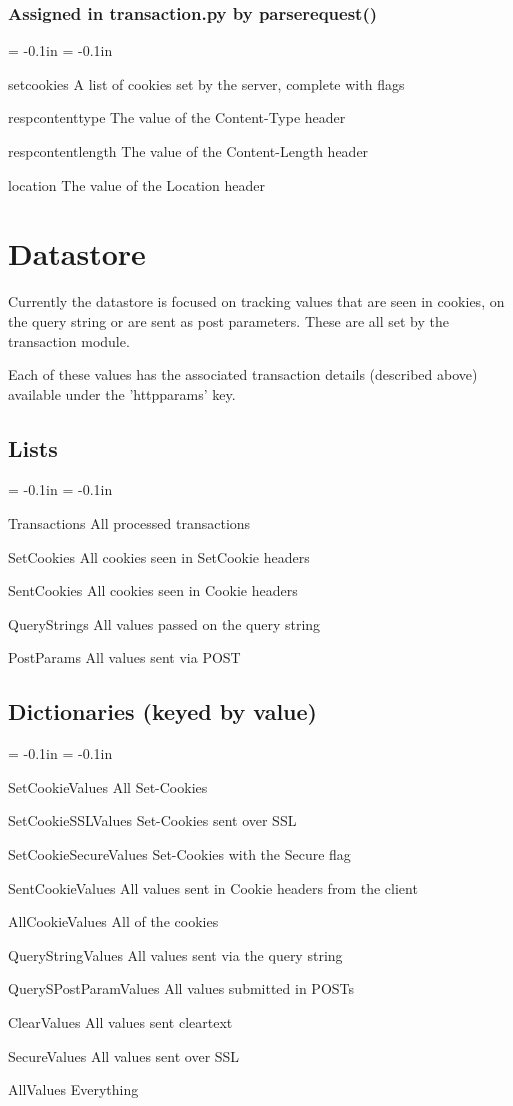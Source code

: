 \documentclass{article}
\newenvironment{mindesc}{\begin{description}\parsep = -0.1in \itemsep = -0.1in}{\end{description}}
\begin{document}
\subsubsection{Assigned in transaction.py by parserequest()}
\begin{mindesc}
\item[setcookies] A list of cookies set by the server, complete with flags
\item[respcontenttype] The value of the Content-Type header
\item[respcontentlength] The value of the Content-Length header
\item[location] The value of the Location header
\end{mindesc}


\section{Datastore}
Currently the datastore is focused on tracking values that are seen in cookies, 
on the query string or are sent as post parameters.  These are all set by the 
transaction module.

Each of these values has the associated transaction details (described above) 
available under the 'httpparams' key.

\subsection{Lists}
\begin{mindesc}
\item[Transactions] All processed transactions
\item[SetCookies] All cookies seen in SetCookie headers
\item[SentCookies] All cookies seen in Cookie headers\
\item[QueryStrings] All values passed on the query string
\item[PostParams] All values sent via POST
\end{mindesc}

\subsection{Dictionaries (keyed by value)}
\begin{mindesc}
\item[SetCookieValues] All Set-Cookies
\item[SetCookieSSLValues] Set-Cookies sent over SSL
\item[SetCookieSecureValues] Set-Cookies with the Secure flag\
\item[SentCookieValues] All values sent in Cookie headers from the client
\item[AllCookieValues] All of the cookies
\item[QueryStringValues] All values sent via the query string
\item[QuerySPostParamValues] All values submitted in POSTs
\item[ClearValues] All values sent cleartext
\item[SecureValues] All values sent over SSL
\item[AllValues] Everything
\end{mindesc}
\end{document}
